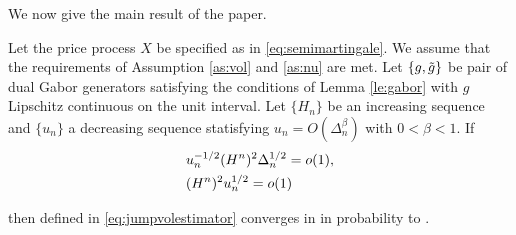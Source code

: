 \begin{comment}
First, we state some obvious results.
\begin{lem}
 Let the price process  $X$ be specified as in  \eqref{eq:semimartingale}. Then,
 \begin{enumerate}
   \item $(x^2 \wedge 1) \ast \mu$ is locally integrable.
   \item $(\vert x \vert I_{\{\vert x \vert > 1\}}) \ast \mu$ is locally integrable.
 \end{enumerate}
\end{lem}
The first statement follows because $(x^2 \wedge 1) \ast \mu_t$ is dominated by $ (x^2I_{\{\vert x \vert \le 1\}}) \ast \mu_t$ and $ (I_{\{\vert x \vert > 1\}}) \ast \mu_t$, which  are increasing processes with bounded jumps and, therefore, locally integrable.    
\end{comment}
We now give the main result of the paper.
\begin{prop} \label{pro:infinity}
  Let the price process  $X$ be specified as in  \eqref{eq:semimartingale}. We assume that the requirements of Assumption \ref{as:vol} and \ref{as:nu} are met. Let $\{g, \tilde{g}\}$ be pair of dual Gabor generators satisfying the conditions of Lemma \eqref{le:gabor} with $g$  Lipschitz continuous on the unit interval. Let  $\{H_n\}$ be an increasing sequence and   $\{u_n\}$  a decreasing sequence statisfying $u_n = O(\Delta_n^\beta)$ with   $0 <\beta<1$. If  
  \begin{align}
    &u_n^{-1/2}(H^n)^2\Delta_n^{1/2} = o(1), \notag\\
    &(H^n)^2u^{1/2}_n = o(1)\notag
    \label{}
  \end{align} 
  \begin{comment}and   that $\nu$ satisfies 
   \begin{align}
    (x^2 \wedge u_n^{1/2}) \ast \nu_1 = o(H_n^{-2}).
    \label{eq:smallo}
  \end{align}
  \end{comment}
  then  \jvn defined in \eqref{eq:jumpvolestimator} converges in \Ltwo in probability to \sv.
\end{prop}
